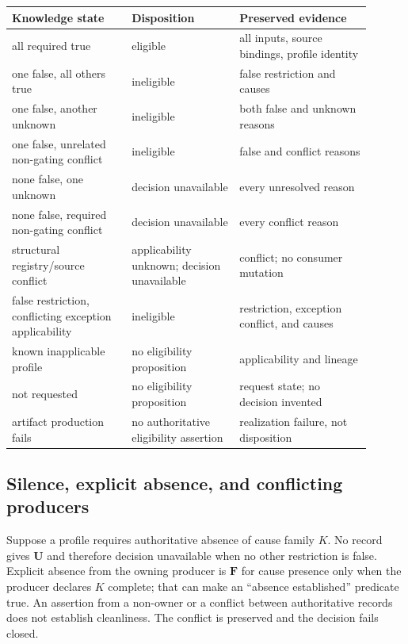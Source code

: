 \begin{center}
\begin{tabular}{p{0.30\linewidth}p{0.27\linewidth}p{0.33\linewidth}}
\toprule
Knowledge state & Disposition & Preserved evidence \\
\midrule
all required true & eligible & all inputs, source bindings, profile identity \\
one false, all others true & ineligible & false restriction and causes \\
one false, another unknown & ineligible & both false and unknown reasons \\
one false, unrelated non-gating conflict & ineligible & false and conflict reasons \\
none false, one unknown & decision unavailable & every unresolved reason \\
none false, required non-gating conflict & decision unavailable & every conflict reason \\
structural registry/source conflict & applicability unknown; decision unavailable & conflict; no consumer mutation \\
false restriction, conflicting exception applicability & ineligible & restriction, exception conflict, and causes \\
known inapplicable profile & no eligibility proposition & applicability and lineage \\
not requested & no eligibility proposition & request state; no decision invented \\
artifact production fails & no authoritative eligibility assertion & realization failure, not disposition \\
\bottomrule
\end{tabular}
\end{center}

\subsection{Silence, explicit absence, and conflicting producers}

Suppose a profile requires authoritative absence of cause family $K$. No
record gives $\mathbf U$ and therefore decision unavailable when no other
restriction is false. Explicit absence from the owning producer is
$\mathbf F$ for cause presence only when the producer declares $K$ complete;
that can make an ``absence established'' predicate true. An assertion from a
non-owner or a conflict between authoritative records does not establish
cleanliness. The conflict is preserved and the decision fails closed.

